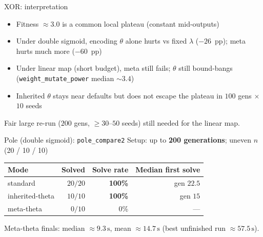 \documentclass[aspectratio=169,11pt]{beamer}
\begin{document}
\begin{frame}{XOR: interpretation}
  \begin{itemize}
    \item Fitness $\approx 3.0$ is a common local plateau (constant mid-outputs)
    \item Under double sigmoid, encoding $\theta$ alone hurts vs fixed $\lambda$
      ($-26$~pp); meta hurts much more ($-60$~pp)
    \item Under linear map (short budget), meta still fails; $\theta$ still
      bound-bangs (\texttt{weight\_mutate\_power} median $\sim 3.4$)
    \item Inherited $\theta$ stays near defaults but does not escape the plateau
      in $100$ gens $\times$ $10$ seeds
  \end{itemize}

  \vspace{0.4em}
  Fair large re-run ($200$ gens, $\ge 30$--$50$ seeds) still needed for the linear map.
\end{frame}

\begin{frame}{Pole (double sigmoid): \texttt{pole\_compare2}}
  Setup: up to \textbf{200 generations}; uneven $n$ (20 / 10 / 10)

  \vspace{0.6em}
  \begin{tabular}{lrrr}
    \toprule
    Mode & Solved & Solve rate & Median first solve \\
    \midrule
    standard & $20/20$ & \textbf{100\%} & gen $22.5$ \\
    inherited-theta & $10/10$ & \textbf{100\%} & gen $15$ \\
    meta-theta & $0/10$ & 0\% & --- \\
    \bottomrule
  \end{tabular}

  \vspace{0.6em}
  Meta-theta finals: median $\approx 9.3\,\mathrm{s}$, mean $\approx 14.7\,\mathrm{s}$
  (best unfinished run $\approx 57.5\,\mathrm{s}$).
\end{frame}
\end{document}
